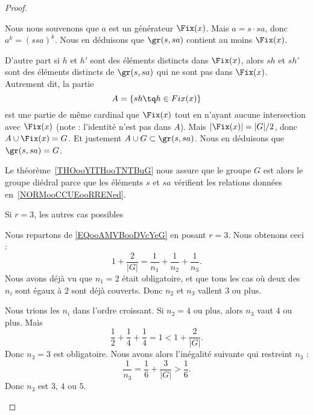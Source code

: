 \begin{proof}
\begin{subproof}
                Nous nous souvenons que \( a\) est un générateur \( \Fix(x)\). Mais \( a=s\cdot sa\), donc \( a^k=(ssa)^k\). Nous en déduisons que \( \gr(s,sa)\) contient au moins \( \Fix(x)\).

                D'autre part si \( h\) et \( h'\) sont des éléments distincts dans \( \Fix(x)\), alors \( sh\) et \( sh'\) sont des éléments distincts de \( \gr(s,sa)\) qui ne sont pas dans \( \Fix(x)\). Autrement dit, la partie
                \begin{equation}
                    A=\{ sh\tq h\in Fix(x) \}
                \end{equation}
                est une partie de même cardinal que \( \Fix(x)\) tout en n'ayant aucune intersection avec \( \Fix(x)\) (note : l'identité n'est pas dans \( A\)). Mais \( | \Fix(x) |=| G |/2\), donc \( A\cup\Fix(x)=G\). Et justement \( A\cup G\subset \gr(s,sa)\). Nous en déduisons que \( \gr(s,sa)=G\).

                Le théorème~\ref{THOooYITHooTNTBuG} nous assure que le groupe \( G\) est alors le groupe diédral parce que les éléments \( s\) et \( sa\) vérifient les relations données en~\ref{NORMooCCUEooRRENed}.

            \item[Si \( r=3\), les autres cas possibles]

                Nous repartons de \eqref{EQooAMVBooDVcYeG} en posant \( r=3\). Nous obtenons ceci :
                \begin{equation}
                    1+\frac{ 2 }{ | G | }=\frac{1}{ n_1 }+\frac{1}{ n_2 }+\frac{1}{ n_3 }.
                \end{equation}
                Nous avons déjà vu que \( n_1=2\) était obligatoire, et que tous les cas où deux des \( n_i\) sont égaux à \( 2\) sont déjà couverts. Donc \( n_2\) et \( n_3\) vallent \( 3\) ou plus.

                Nous trions les \( n_i\) dans l'ordre croissant. Si \( n_2=4\) ou plus, alors \( n_3\) vaut \( 4\) ou plus. Mais
                \begin{equation}
                    \frac{ 1 }{2}+\frac{1}{ 4 }+\frac{1}{ 4 }=1<1+\frac{ 2 }{ | G | }.
                \end{equation}
                Donc \( n_3=3\) est obligatoire. Nous avons alors l'inégalité suivante qui restreint \( n_3\) :
                \begin{equation}
                    \frac{1}{ n_3 }=\frac{1}{ 6 }+\frac{ 3 }{ | G | }>\frac{1}{ 6 }.
                \end{equation}
                Donc \( n_3\) est \( 3\), \( 4\) ou \( 5\).


\end{subproof}
\end{proof}
